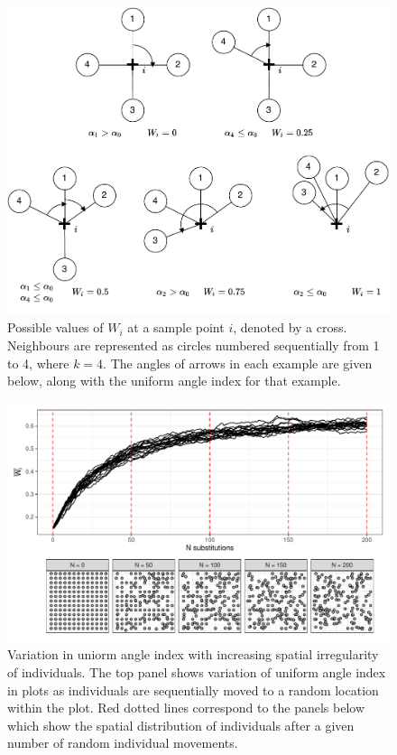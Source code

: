 \documentclass[11pt,a4paper]{article}
\begin{document}
\begin{figure}
\centering
	\includegraphics[width=\linewidth]{winkelmass}
	\caption{Possible values of $W_{i}$ at a sample point $i$, denoted by a cross. Neighbours are represented as circles numbered sequentially from 1 to 4, where $k = 4$. The angles of arrows in each example are given below, along with the uniform angle index for that example.}
	\label{winkelmass}
\end{figure}

\begin{figure}
\centering
	\includegraphics[width=\linewidth]{wi_diagram}
	\caption{Variation in uniorm angle index with increasing spatial irregularity of individuals. The top panel shows variation of uniform angle index in \wireps{} plots as individuals are sequentially moved to a random location within the plot. Red dotted lines correspond to the panels below which show the spatial distribution of individuals after a given number of random individual movements.}
	\label{wi_diagram}
\end{figure}
\end{document}

